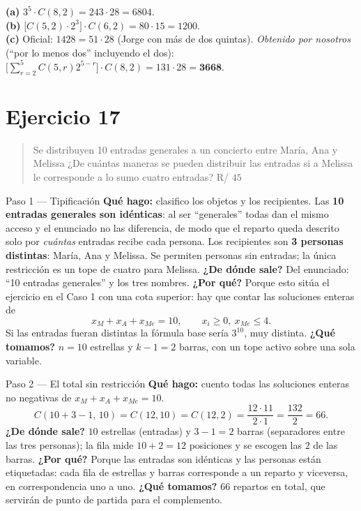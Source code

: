 \documentclass[11pt]{article}
\begin{document}
\begin{resp}
\textbf{(a)} $3^5\cdot C(8,2)=243\cdot 28=6804$.\\
\textbf{(b)} $\bigl[C(5,2)\cdot 2^3\bigr]\cdot C(6,2)=80\cdot 15=1200$.\\
\textbf{(c)} Oficial: $1428=51\cdot 28$ (Jorge con más de dos quintas). \emph{Obtenido por nosotros} (``por lo menos dos'' incluyendo el dos):
$\bigl[\sum_{r=2}^{5}C(5,r)2^{5-r}\bigr]\cdot C(8,2)=131\cdot 28=\mathbf{3668}$.
\end{resp}

\section*{Ejercicio 17}

\begin{quote}
Se distribuyen 10 entradas generales a un concierto entre María, Ana y Melissa ¿De cuántas maneras se pueden distribuir las entradas si a Melissa le corresponde a lo sumo cuatro entradas? \hfill R/ $45$
\end{quote}

\begin{paso}{Paso 1 --- Tipificación}
\textbf{Qué hago:} clasifico los objetos y los recipientes.
Las \textbf{10 entradas generales son idénticas}: al ser ``generales'' todas dan el mismo acceso y el enunciado no las diferencia, de modo que el reparto queda descrito solo por \emph{cuántas} entradas recibe cada persona. Los recipientes son \textbf{3 personas distintas}: María, Ana y Melissa. Se permiten personas sin entradas; la única restricción es un tope de cuatro para Melissa.
\textbf{¿De dónde sale?} Del enunciado: ``10 entradas generales'' y los tres nombres.
\textbf{¿Por qué?} Porque esto sitúa el ejercicio en el Caso 1 con una cota superior: hay que contar las soluciones enteras de
\[
x_M+x_A+x_{Me}=10,\qquad x_i\ge 0,\ x_{Me}\le 4 .
\]
Si las entradas fueran distintas la fórmula base sería $3^{10}$, muy distinta.
\textbf{¿Qué tomamos?} $n=10$ estrellas y $k-1=2$ barras, con un tope activo sobre una sola variable.
\end{paso}

\begin{paso}{Paso 2 --- El total sin restricción}
\textbf{Qué hago:} cuento todas las soluciones enteras no negativas de $x_M+x_A+x_{Me}=10$.
\[
C(10+3-1,\,10)=C(12,10)=C(12,2)=\frac{12\cdot 11}{2\cdot 1}=\frac{132}{2}=66 .
\]
\textbf{¿De dónde sale?} $10$ estrellas (entradas) y $3-1=2$ barras (separadores entre las tres personas); la fila mide $10+2=12$ posiciones y se escogen las $2$ de las barras.
\textbf{¿Por qué?} Porque las entradas son idénticas y las personas están etiquetadas: cada fila de estrellas y barras corresponde a un reparto y viceversa, en correspondencia uno a uno.
\textbf{¿Qué tomamos?} $66$ repartos en total, que servirán de punto de partida para el complemento.
\end{paso}
\end{document}
